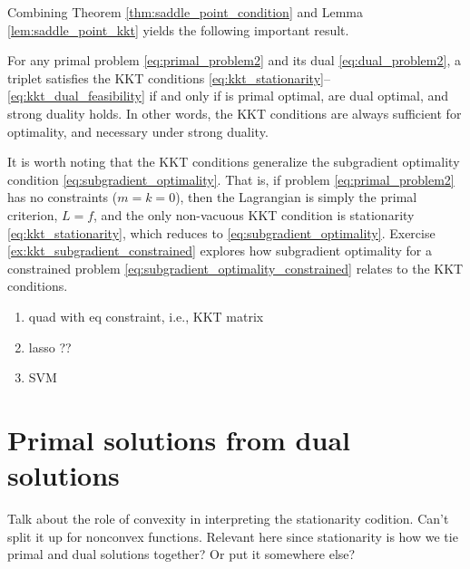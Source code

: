 Combining Theorem \ref{thm:saddle_point_condition} and Lemma
\ref{lem:saddle_point_kkt} yields the following important result. 

\begin{Theorem}
\label{thm:kkt_conditions}
For any primal problem \eqref{eq:primal_problem2} and its dual
\eqref{eq:dual_problem2}, a triplet 
satisfies the KKT conditions
\eqref{eq:kkt_stationarity}--\eqref{eq:kkt_dual_feasibility} if and only if 
 is primal optimal,  are dual
optimal, and strong duality holds. 
In other words, the KKT conditions are always sufficient for optimality, and
necessary under strong duality.  
\end{Theorem}

It is worth noting that the KKT conditions generalize the subgradient optimality
condition \eqref{eq:subgradient_optimality}. That is, if problem
\eqref{eq:primal_problem2} has no constraints ($m = k = 0$), then the Lagrangian
is simply the primal criterion, $L = f$, and the only non-vacuous KKT condition
is stationarity \eqref{eq:kkt_stationarity}, which reduces to
\eqref{eq:subgradient_optimality}. Exercise \ref{ex:kkt_subgradient_constrained}
explores how subgradient optimality for a constrained problem
\eqref{eq:subgradient_optimality_constrained} relates to the KKT conditions.  

\begin{Example}

\begin{enumerate}[label=\alph*., ref=\alph*]

\item quad with eq constraint, i.e., KKT matrix

\item lasso ??

\item SVM
\end{enumerate}
\end{Example}


\section{Primal solutions from dual solutions}

\begin{Remark}
Talk about the role of convexity in interpreting the stationarity codition.
Can't split it up for nonconvex functions. Relevant here since stationarity is
how we tie primal and dual solutions together? Or put it somewhere
else? 
\end{Remark} 

